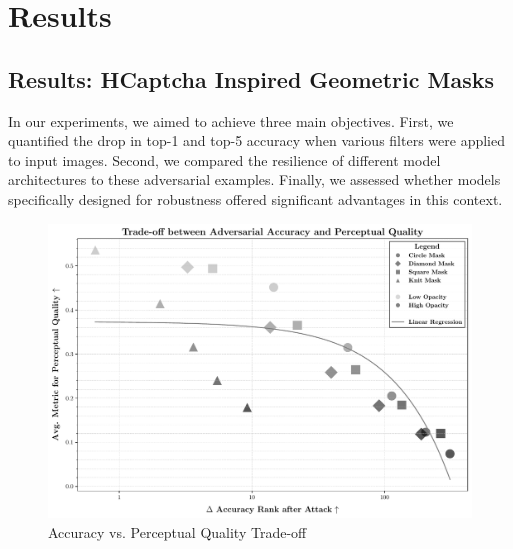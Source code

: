 \documentclass[a4paper, oneside]{discothesis}
\begin{document}







\chapter{Results}

\section{Results: HCaptcha Inspired Geometric Masks}

In our experiments, we aimed to achieve three main objectives. First, we quantified the drop in top-1 and top-5 accuracy when various filters were applied to input images. Second, we compared the resilience of different model architectures to these adversarial examples. Finally, we assessed whether models specifically designed for robustness offered significant advantages in this context.

\begin{figure}
	\centering
	\includegraphics[width=1\columnwidth]{figures/eval_cls_generalizability.pdf}
	\caption{Accuracy vs. Perceptual Quality Trade-off}
	\label{fig:accpercept}
\end{figure}

\end{document}
